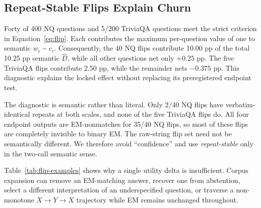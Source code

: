 \documentclass[sigconf,nonacm]{acmart}
\newcommand{\Dhat}{\widehat{D}}
\begin{document}
\subsection{Repeat-Stable Flips Explain Churn}
\label{sec:stable}

Forty of 400 NQ questions and 5/200 TriviaQA questions meet the strict criterion in Equation~\ref{eq:flip}. Each contributes the maximum per-question value of one to semantic $w_i-c_i$. Consequently, the 40 NQ flips contribute 10.00 pp of the total 10.25 pp semantic $\Dhat$, while all other questions net only $+0.25$ pp. The five TriviaQA flips contribute 2.50 pp, while the remainder nets $-0.375$ pp. This diagnostic explains the locked effect without replacing its preregistered endpoint test.

The diagnostic is semantic rather than literal. Only 2/40 NQ flips have verbatim-identical repeats at both scales, and none of the five TriviaQA flips do. All four endpoint outputs are EM-nonmatches for 35/40 NQ flips, so most of these flips are completely invisible to binary EM. The raw-string flip set need not be semantically different. We therefore avoid ``confidence'' and use \emph{repeat-stable} only in the two-call semantic sense.

Table~\ref{tab:flip-examples} shows why a single utility delta is insufficient. Corpus expansion can remove an EM-matching answer, recover one from abstention, select a different interpretation of an underspecified question, or traverse a non-monotone $X\to Y\to X$ trajectory while EM remains unchanged throughout.
\end{document}
